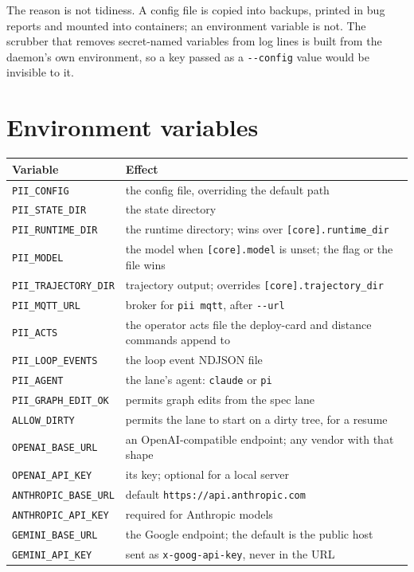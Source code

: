 The reason is not tidiness. A config file is copied into backups, printed in bug reports and
mounted into containers; an environment variable is not. The scrubber that removes
secret-named variables from log lines is built from the daemon's own environment, so a key
passed as a \texttt{-{}-config} value would be invisible to it.

\section{Environment variables}

\begin{longtable}{@{}>{\raggedright\arraybackslash}p{}>{\raggedright\arraybackslash}p{}@{}}
  \toprule
  \textbf{Variable} & \textbf{Effect} \\
  \midrule
  \endhead
  \texttt{PII\_CONFIG} & the config file, overriding the default path \\
  \texttt{PII\_STATE\_DIR} & the state directory \\
  \texttt{PII\_RUNTIME\_DIR} & the runtime directory; wins over
    \texttt{[core].runtime\_dir} \\
  \texttt{PII\_MODEL} & the model when \texttt{[core].model} is unset; the flag or the file
    wins \\
  \texttt{PII\_TRAJECTORY\_DIR} & trajectory output; overrides
    \texttt{[core].trajectory\_dir} \\
  \texttt{PII\_MQTT\_URL} & broker for \texttt{pii mqtt}, after \texttt{-{}-url} \\
  \texttt{PII\_ACTS} & the operator acts file the deploy-card and distance commands append to \\
  \texttt{PII\_LOOP\_EVENTS} & the loop event NDJSON file \\
  \texttt{PII\_AGENT} & the lane's agent: \texttt{claude} or \texttt{pi} \\
  \texttt{PII\_GRAPH\_EDIT\_OK} & permits graph edits from the spec lane \\
  \texttt{ALLOW\_DIRTY} & permits the lane to start on a dirty tree, for a resume \\
  \texttt{OPENAI\_BASE\_URL} & an OpenAI-compatible endpoint; any vendor with that shape \\
  \texttt{OPENAI\_API\_KEY} & its key; optional for a local server \\
  \texttt{ANTHROPIC\_BASE\_URL} & default \texttt{https://api.anthropic.com} \\
  \texttt{ANTHROPIC\_API\_KEY} & required for Anthropic models \\
  \texttt{GEMINI\_BASE\_URL} & the Google endpoint; the default is the public host \\
  \texttt{GEMINI\_API\_KEY} & sent as \texttt{x-goog-api-key}, never in the URL \\
  \bottomrule
\end{longtable}

